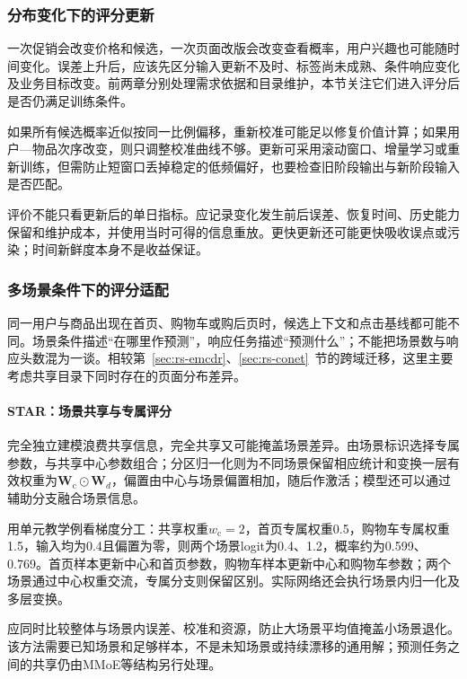 \subsubsection{分布变化下的评分更新}
\label{sec:rs-score-drift}

一次促销会改变价格和候选，一次页面改版会改变查看概率，用户兴趣也可能随时间变化。误差上升后，应该先区分输入更新不及时、标签尚未成熟、条件响应变化及业务目标改变。前两章分别处理需求依据和目录维护，本节关注它们进入评分后是否仍满足训练条件。

如果所有候选概率近似按同一比例偏移，重新校准可能足以修复价值计算；如果用户—物品次序改变，则只调整校准曲线不够。更新可采用滚动窗口、增量学习或重新训练，但需防止短窗口丢掉稳定的低频偏好，也要检查旧阶段输出与新阶段输入是否匹配。

评价不能只看更新后的单日指标。应记录变化发生前后误差、恢复时间、历史能力保留和维护成本，并使用当时可得的信息重放。更快更新还可能更快吸收误点或污染；时间新鲜度本身不是收益保证。

\subsubsection{多场景条件下的评分适配}
\label{sec:rs-multiscenario}

同一用户与商品出现在首页、购物车或购后页时，候选上下文和点击基线都可能不同。场景条件描述“在哪里作预测”，响应任务描述“预测什么”；不能把场景数与响应头数混为一谈。相较第~\ref{sec:rs-emcdr}、\ref{sec:rs-conet}~节的跨域迁移，这里主要考虑共享目录下同时存在的页面分布差异。

\paragraph{STAR：场景共享与专属评分}
\label{sec:rs-star}

完全独立建模浪费共享信息，完全共享又可能掩盖场景差异。由场景标识选择专属参数，与共享中心参数组合；分区归一化则为不同场景保留相应统计和变换一层有效权重为$\bm W_{\mathrm c}\odot\bm W_d$，偏置由中心与场景偏置相加，随后作激活；模型还可以通过辅助分支融合场景信息。

用单元教学例看梯度分工：共享权重$w_{\mathrm c}=2$，首页专属权重0.5，购物车专属权重1.5，输入均为0.4且偏置为零，则两个场景logit为0.4、1.2，概率约为0.599、0.769。首页样本更新中心和首页参数，购物车样本更新中心和购物车参数；两个场景通过中心权重交流，专属分支则保留区别。实际网络还会执行场景内归一化及多层变换。

应同时比较整体与场景内误差、校准和资源，防止大场景平均值掩盖小场景退化。该方法需要已知场景和足够样本，不是未知场景或持续漂移的通用解；预测任务之间的共享仍由MMoE等结构另行处理。

